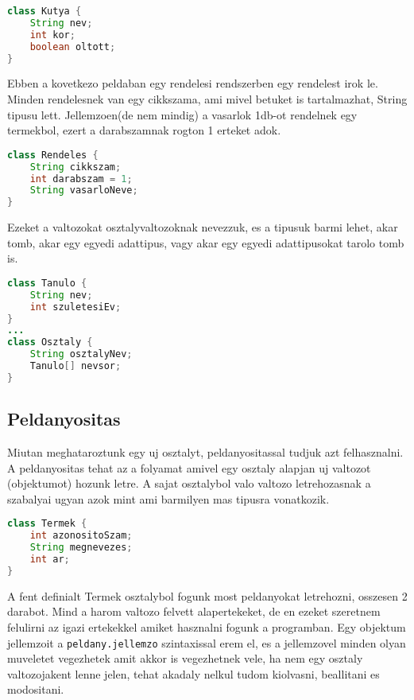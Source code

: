 \documentclass{article}
\let\l\lstinline
\begin{document}
\begin{lstlisting}[language=Java, caption=Pelda osztaly]
class Kutya {
    String nev;
    int kor;
    boolean oltott;
}
\end{lstlisting}

Ebben a kovetkezo peldaban egy rendelesi rendszerben egy rendelest irok le. Minden rendelesnek van egy cikkszama, ami
mivel betuket is tartalmazhat, String tipusu lett. Jellemzoen(de nem mindig) a vasarlok 1db-ot rendelnek egy termekbol,
ezert a darabszamnak rogton 1 erteket adok.

\begin{lstlisting}[language=Java, caption=Pelda osztaly]
class Rendeles {
    String cikkszam;
    int darabszam = 1;
    String vasarloNeve;
}
\end{lstlisting}

\newpage

Ezeket a valtozokat osztalyvaltozoknak nevezzuk, es a tipusuk barmi lehet, akar tomb, akar egy egyedi adattipus, vagy
akar egy egyedi adattipusokat tarolo tomb is.

\begin{lstlisting}[language=Java, caption=Pelda osztaly]
class Tanulo {
    String nev;
    int szuletesiEv;
}
...
class Osztaly {
    String osztalyNev;
    Tanulo[] nevsor;
}
\end{lstlisting}

\newpage

\subsection{Peldanyositas}

Miutan meghataroztunk egy uj osztalyt, peldanyositassal tudjuk azt felhasznalni. A peldanyositas tehat az a folyamat
amivel egy osztaly alapjan uj valtozot (objektumot) hozunk letre. A sajat osztalybol valo valtozo letrehozasnak a
szabalyai ugyan azok mint ami barmilyen mas tipusra vonatkozik.

\begin{lstlisting}[language=Java, caption=Webaruhaz termekeit leiro osztaly deklaralasa]
class Termek {
    int azonositoSzam;
    String megnevezes;
    int ar;
}
\end{lstlisting}

A fent definialt Termek osztalybol fogunk most peldanyokat letrehozni, osszesen 2 darabot. Mind a harom valtozo
felvett alapertekeket, de en ezeket szeretnem felulirni az igazi ertekekkel amiket hasznalni fogunk a programban.
Egy objektum jellemzoit a \l{peldany.jellemzo} szintaxissal erem el, es a jellemzovel minden olyan muveletet
vegezhetek amit akkor is vegezhetnek vele, ha nem egy osztaly valtozojakent lenne jelen, tehat akadaly nelkul tudom
kiolvasni, beallitani es modositani.
\end{document}
